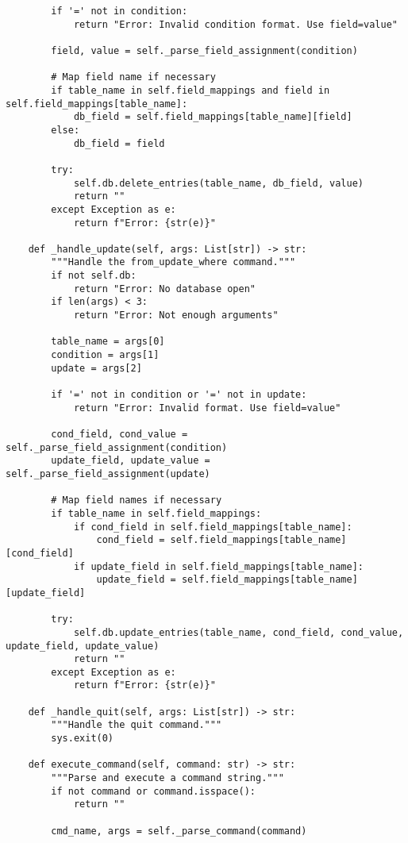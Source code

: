 \documentclass[utf8]{article}
\begin{document}
\begin{verbatim}
        if '=' not in condition:
            return "Error: Invalid condition format. Use field=value"
        
        field, value = self._parse_field_assignment(condition)
        
        # Map field name if necessary
        if table_name in self.field_mappings and field in self.field_mappings[table_name]:
            db_field = self.field_mappings[table_name][field]
        else:
            db_field = field
        
        try:
            self.db.delete_entries(table_name, db_field, value)
            return ""
        except Exception as e:
            return f"Error: {str(e)}"
    
    def _handle_update(self, args: List[str]) -> str:
        """Handle the from_update_where command."""
        if not self.db:
            return "Error: No database open"
        if len(args) < 3:
            return "Error: Not enough arguments"
        
        table_name = args[0]
        condition = args[1]
        update = args[2]
        
        if '=' not in condition or '=' not in update:
            return "Error: Invalid format. Use field=value"
        
        cond_field, cond_value = self._parse_field_assignment(condition)
        update_field, update_value = self._parse_field_assignment(update)
        
        # Map field names if necessary
        if table_name in self.field_mappings:
            if cond_field in self.field_mappings[table_name]:
                cond_field = self.field_mappings[table_name][cond_field]
            if update_field in self.field_mappings[table_name]:
                update_field = self.field_mappings[table_name][update_field]
        
        try:
            self.db.update_entries(table_name, cond_field, cond_value, update_field, update_value)
            return ""
        except Exception as e:
            return f"Error: {str(e)}"
    
    def _handle_quit(self, args: List[str]) -> str:
        """Handle the quit command."""
        sys.exit(0)
    
    def execute_command(self, command: str) -> str:
        """Parse and execute a command string."""
        if not command or command.isspace():
            return ""
        
        cmd_name, args = self._parse_command(command)
        

\end{verbatim}
\end{document}
